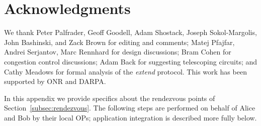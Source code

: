 \documentclass[times,10pt,twocolumn]{article}
\begin{document}

\section*{Acknowledgments}
 We thank Peter Palfrader, Geoff Goodell, Adam Shostack, Joseph Sokol-Margolis,
   John Bashinski, and Zack Brown
   for editing and comments;
 Matej Pfajfar, Andrei Serjantov, Marc Rennhard for design discussions;
 Bram Cohen for congestion control discussions;
 Adam Back for suggesting telescoping circuits; and
 Cathy Meadows for formal analysis of the \emph{extend} protocol.
 This work has been supported by ONR and DARPA.





\newpage
\appendix

\label{sec:rendezvous-specifics}

In this appendix we provide specifics about the rendezvous points
of Section~\ref{subsec:rendezvous}. %
%
%
The following steps are
performed on behalf of Alice and Bob by their local OPs;
application integration is described more fully below.
\end{document}
